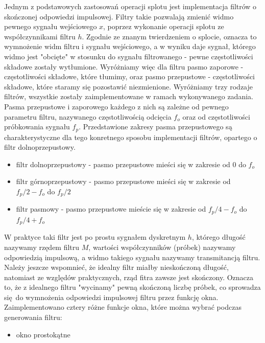 \documentclass[12pt]{article}
\begin{document}
{        Jednym z podstawowych zastosowań operacji splotu jest implementacja filtrów o skończonej
        odpowiedzi impulsowej. Filtry takie pozwalają zmienić widmo pewnego sygnału wejściowego $x$,
        poprzez wykonanie operacji splotu ze współczynnikami filtru $h$. Zgodnie ze znanym
        twierdzeniem o splocie, oznacza to wymnożenie widm filtru i sygnału wejściowego, a w wyniku
        daje sygnał, którego widmo jest "obcięte" w stosunku do sygnału filtrowanego - pewne
        częstotliwości składowe zostały wytłumione.  Wyróżniamy więc dla filtru pasmo zaporowe -
        częstotliwości składowe, które tłumimy, oraz pasmo przepustowe - częstotliwości składowe,
        które staramy się pozostawić niezmienione.  Wyróżniamy trzy rodzaje filtrów, wszystkie
        zostały zaimplementowane w ramach wykonywanego zadania. Pasma przepustowe i zaporowego
        każdego z nich są zależne od pewnego parametru filtru, nazywanego częstotliwością odcięcia
        $f_o$ oraz od częstotliwości próbkowania sygnału $f_p$. Przedstawione zakresy pasma
        przepustowego są charakterystyczne dla tego konretnego sposobu implementacji filtrów,
        opartego o filtr dolnoprzepustowy.
        \begin{itemize}
            \item filtr dolnoprzepustowy - pasmo przepustowe mieści się w zakresie od $0$ do $f_o$
            \item filtr górnoprzepustowy - pasmo przepustowe mieści się w zakresie od $f_p / 2 - f_o$ do
                $f_p / 2$
            \item filtr pasmowy - pasmo przepustowe mieście się w zakresie od $f_p / 4 - f_o$ do
                $f_p / 4 + f_o$
        \end{itemize}
        W praktyce taki filtr jest po prostu sygnałem dyskretnym $h$, którego długość nazywamy
        rzędem filtru $M$, wartości współczynników (próbek) nazywamy odpowiedzią impulsową, a widmo
        takiego sygnału nazywamy transmitancją filtru. Należy jeszcze wspomnieć, że idealny filtr
        miałby nieskończoną długość, natomiast ze względów praktycznych, rząd fitra zawsze jest
        skończony. Oznacza to, że z idealnego filtru "wycinamy" pewną skończoną liczbę próbek, co
        sprowadza się do wymnożenia odpowiedzi impulsowej filtru przez funkcję okna.
        Zaimplementowano cztery różne funkcje okna, które można wybrać podczas generowania filtru:
        \begin{itemize}
            \item okno prostokątne

\end{itemize}}
\end{document}
